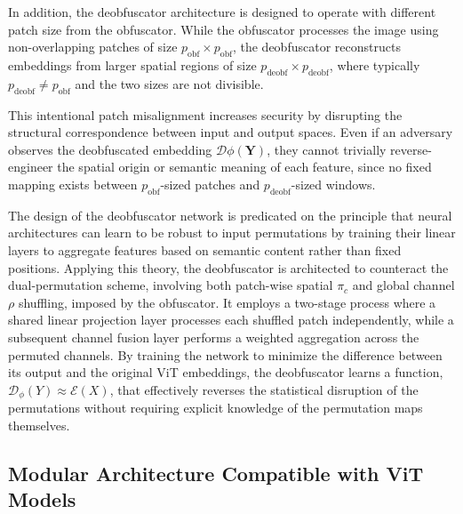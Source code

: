 \documentclass{ieeeaccess}
\begin{document}
In addition, the deobfuscator architecture is designed to operate with different patch size from the obfuscator. While the obfuscator processes the image using non-overlapping patches of size $p_{\text{obf}} \times p_{\text{obf}}$, the deobfuscator reconstructs embeddings from larger spatial regions of size $p_{\text{deobf}} \times p_{\text{deobf}}$, where typically $p_{\text{deobf}} \neq p_{\text{obf}}$ and the two sizes are not divisible.

This intentional patch misalignment increases security by disrupting the structural correspondence between input and output spaces. Even if an adversary observes the deobfuscated embedding $\mathcal{D}\phi(\mathbf{Y})$, they cannot trivially reverse-engineer the spatial origin or semantic meaning of each feature, since no fixed mapping exists between $p_{\text{obf}}$-sized patches and $p_{\text{deobf}}$-sized windows.

{The design of the deobfuscator network is predicated on the principle that neural architectures can learn to be robust to input permutations by training their linear layers to aggregate features based on semantic content rather than fixed positions. Applying this theory, the deobfuscator is architected to counteract the dual-permutation scheme, involving both patch-wise spatial $\pi_c$ and global channel $\rho$ shuffling, imposed by the obfuscator. It employs a two-stage process where a shared linear projection layer processes each shuffled patch independently, while a subsequent channel fusion layer performs a weighted aggregation across the permuted channels. By training the network to minimize the difference between its output and the original ViT embeddings, the deobfuscator learns a function, $\mathcal{D}_{\phi}(Y) \approx \mathcal{E}(X)$, that effectively reverses the statistical disruption of the permutations without requiring explicit knowledge of the permutation maps themselves.}


\subsection{Modular Architecture Compatible with ViT Models}\label{sec:pro:modular}
\end{document}
